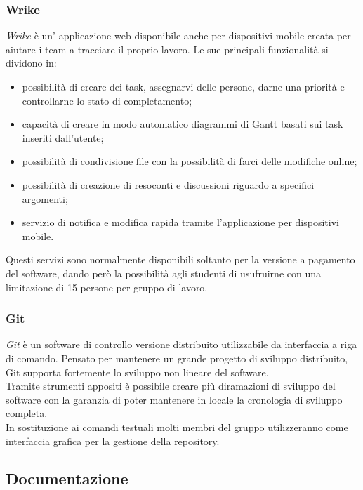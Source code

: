 \documentclass[../NormediProgetto.tex]{subfiles}
\begin{document}
	\subsubsection{Wrike}

	\textit{Wrike} è un' applicazione web disponibile anche per dispositivi mobile creata per aiutare i team a tracciare il proprio lavoro. Le sue principali funzionalità si dividono in:
	\begin{itemize}
		\item possibilità di creare dei task, assegnarvi delle persone, darne una priorità e controllarne lo stato di completamento;
		\item capacità di creare in modo automatico diagrammi di Gantt basati sui task inseriti dall'utente;
		\item possibilità di condivisione file con la possibilità di farci delle modifiche online;
		\item possibilità di creazione di resoconti e discussioni riguardo a specifici argomenti;
		\item servizio di notifica e modifica rapida tramite l'applicazione per dispositivi mobile.
	\end{itemize}
	Questi servizi sono normalmente disponibili soltanto per la versione a pagamento del software, dando però la possibilità agli studenti di usufruirne con una limitazione di 15 persone per gruppo di lavoro.

	\subsubsection{Git}

	\textit{Git} è un software di controllo versione distribuito utilizzabile da interfaccia a riga di comando. Pensato per mantenere un grande progetto di sviluppo distribuito, Git supporta fortemente lo sviluppo non lineare del software.
	\\ \noindent Tramite strumenti appositi è possibile creare più diramazioni di sviluppo del software con la garanzia di poter mantenere in locale la cronologia di sviluppo completa.
	\\ \noindent In sostituzione ai comandi testuali molti membri del gruppo utilizzeranno  come interfaccia grafica per la gestione della repository.
	
	
	\subsection{Documentazione}
	
\end{document}
